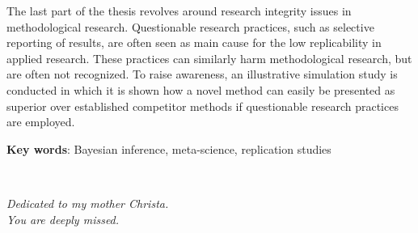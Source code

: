 The last part of the thesis revolves around research integrity issues in
methodological research. Questionable research practices, such as selective
reporting of results, are often seen as main cause for the low replicability in
applied research. These practices can similarly harm methodological research,
but are often not recognized. To raise awareness, an illustrative simulation
study is conducted in which it is shown how a novel method can easily be
presented as superior over established competitor methods if questionable
research practices are employed.


\textbf{Key words}: Bayesian inference, meta-science, replication studies


\newpage ~

\newpage



\begin{center}
  \vspace*{5cm}

  \textit{Dedicated to my mother Christa. \\
    You are deeply missed.}
\end{center}
